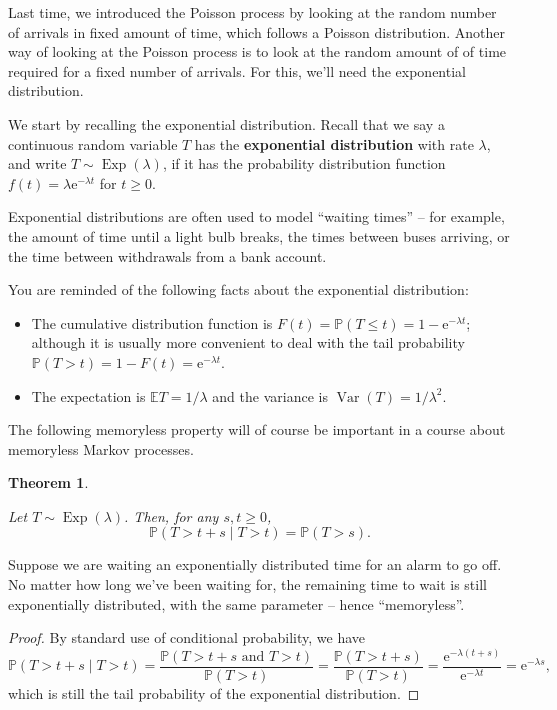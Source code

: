 \documentclass[
  a4paper,
]{article}
\providecommand{\tightlist}{%
  \setlength{\itemsep}{0pt}\setlength{\parskip}{0pt}}
\newtheorem{theorem}{Theorem}[section]
\theoremstyle{definition}
\theoremstyle{definition}
\theoremstyle{definition}
\theoremstyle{remark}
\begin{document}
Last time, we introduced the Poisson process by looking at the random number of arrivals in fixed amount of time, which follows a Poisson distribution. Another way of looking at the Poisson process is to look at the random amount of of time required for a fixed number of arrivals. For this, we'll need the exponential distribution.

We start by recalling the exponential distribution.
Recall that we say a continuous random variable \(T\) has the \textbf{exponential distribution} with rate \(\lambda\), and write \(T \sim \operatorname{Exp}(\lambda)\), if it has the probability distribution function \(f(t) = \lambda \mathrm{e}^{-\lambda t}\) for \(t \geq 0\).

Exponential distributions are often used to model ``waiting times'' -- for example, the amount of time until a light bulb breaks, the times between buses arriving, or the time between withdrawals from a bank account.

You are reminded of the following facts about the exponential distribution:

\begin{itemize}
\tightlist
\item
  The cumulative distribution function is \(F(t) = \mathbb P(T \leq t) = 1 - \mathrm{e}^{-\lambda t}\); although it is usually more convenient to deal with the tail probability \(\mathbb P(T > t) = 1 - F(t) = \mathrm{e}^{-\lambda t}\).
\item
  The expectation is \(\mathbb E T = 1/\lambda\) and the variance is \(\operatorname{Var}(T) = 1/\lambda^2\).
\end{itemize}

The following memoryless property will of course be important in a course about memoryless Markov processes.

\begin{theorem}
\protect\hypertarget{thm:memoryless-thm}{}\label{thm:memoryless-thm}

Let \(T \sim \operatorname{Exp}(\lambda)\). Then, for any \(s,t\geq0\),
\[ \mathbb P(T > t + s \mid T > t) = \mathbb P(T > s) . \]

\end{theorem}

Suppose we are waiting an exponentially distributed time for an alarm to go off. No matter how long we've been waiting for, the remaining time to wait is still exponentially distributed, with the same parameter -- hence ``memoryless''.

\begin{proof}

By standard use of conditional probability, we have
\[ \mathbb P(T > t + s \mid T > t) = \frac{\mathbb P(T > t + s \text{ and } T > t)}{\mathbb P(T > t)} =  \frac{\mathbb P(T > t + s)}{\mathbb P(T > t)} = \frac{\mathrm{e}^{-\lambda(t+s)}}{\mathrm{e}^{-\lambda t}} = \mathrm{e}^{-\lambda s} , \]
which is still the tail probability of the exponential distribution.

\end{proof}
\end{document}
